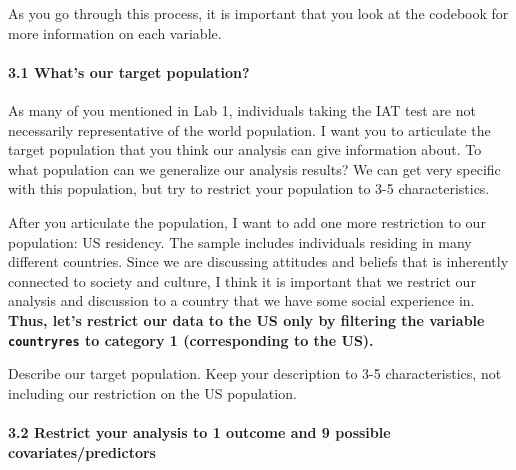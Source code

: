 \documentclass[
  letterpaper,
  DIV=11,
  numbers=noendperiod]{scrartcl}
\let\oldparagraph\paragraph
\renewcommand{\paragraph}[1]{\oldparagraph{#1}\mbox{}}
\begin{document}
As you go through this process, it is important that you look at the
codebook for more information on each variable.

\hypertarget{whats-our-target-population}{%
\paragraph{3.1 What's our target
population?}\label{whats-our-target-population}}

As many of you mentioned in Lab 1, individuals taking the IAT test are
not necessarily representative of the world population. I want you to
articulate the target population that you think our analysis can give
information about. To what population can we generalize our analysis
results? We can get very specific with this population, but try to
restrict your population to 3-5 characteristics.

After you articulate the population, I want to add one more restriction
to our population: US residency. The sample includes individuals
residing in many different countries. Since we are discussing attitudes
and beliefs that is inherently connected to society and culture, I think
it is important that we restrict our analysis and discussion to a
country that we have some social experience in. \textbf{Thus, let's
restrict our data to the US only by filtering the variable
\texttt{countryres} to category 1 (corresponding to the US).}

\begin{tcolorbox}[enhanced jigsaw, coltitle=black, bottomrule=.15mm, opacityback=0, arc=.35mm, toprule=.15mm, colbacktitle=quarto-callout-important-color!10!white, left=2mm, colback=white, opacitybacktitle=0.6, colframe=quarto-callout-important-color-frame, rightrule=.15mm, leftrule=.75mm, breakable, bottomtitle=1mm, titlerule=0mm, toptitle=1mm, title=\textcolor{quarto-callout-important-color}{\faExclamation}\hspace{0.5em}{Task}]

Describe our target population. Keep your description to 3-5
characteristics, not including our restriction on the US population.

\end{tcolorbox}

\hypertarget{restrict-your-analysis-to-1-outcome-and-9-possible-covariatespredictors}{%
\paragraph{3.2 Restrict your analysis to 1 outcome and 9 possible
covariates/predictors}\label{restrict-your-analysis-to-1-outcome-and-9-possible-covariatespredictors}}
\end{document}
